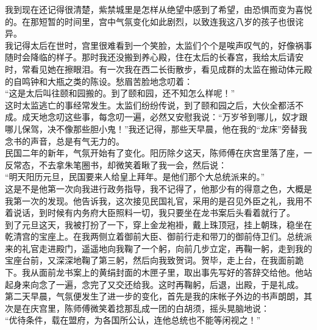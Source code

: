 我到现在还记得很清楚，紫禁城里是怎样从绝望中感到了希望，由恐惧而变为喜悦的。在那短暂的时间里，宫中气氛变化如此剧烈，以致连我这八岁的孩子也很诧异。\\

我记得太后在世时，宫里很难看到一个笑脸，太监们个个是唉声叹气的，好像祸事随时会降临的样子。那时我还没搬到养心殿，住在太后的长春宫，我给太后请安时，常看见她在擦眼泪。有一次我在西二长街散步，看见成群的太监在搬动体元殿的自鸣钟和大瓶之类的陈设。愁眉苦脸地念叨着：\\

“这是太后叫往颐和园搬的。到了颐和园，还不知怎么样呢！”\\

这时太监逃亡的事经常发生。太监们纷纷传说，到了颐和园之后，大伙全都活不成。成天地念叨这些事，每念叨一遍，必然又安慰我说：“万岁爷到哪儿，奴才跟哪儿保驾，决不像那些胆小鬼！”我还记得，那些天早晨，他在我的“龙床”旁替我念书的声音，总是有气无力的。\\

民国二年的新年，气氛开始有了变化。阳历除夕这天，陈师傅在庆宫里落了座，一反常态，不去拿朱笔圈书，却微笑着瞅了我一会，然后说：\\

“明天阳历元旦，民国要来人给皇上拜年。是他们那个大总统派来的。”\\

这是不是他第一次向我进行政务指导，我不记得了，他那少有的得意之色，大概是我第一次的发现。他告诉我，这次接见民国礼官，采用的是召见外臣之礼，我用不着说话，到时候有内务府大臣照料一切，我只要坐在龙书案后头看着就行了。\\

到了元旦这天，我被打扮了一下，穿上金龙袍褂，戴上珠顶冠，挂上朝珠，稳坐在乾清宫的宝座上。在我两侧立着御前大臣、御前行走和带刀的御前侍卫们。总统派来的礼官走进殿门，遥遥地向我鞠了一个躬，向前几步立定，再鞠一躬，走到我的宝座台前，又深深地鞠了第三躬，然后向我致贺词。贺毕，走上台，在我面前跪下。我从面前龙书案上的黄绢封面的木匣子里，取出事先写好的答辞交给他。他站起身来向念了一遍，念完了又交还给我。这时再鞠躬，后退，出殿，于是礼成。\\

第二天早晨，气氛便发生了进一步的变化，首先是我的床帐子外边的书声朗朗，其次是在庆宫里，陈师傅微笑着捻那乱成一团的白胡须，摇头晃脑地说：\\

“优待条件，载在盟府，为各国所公认，连他总统也不能等闲视之！”\\

